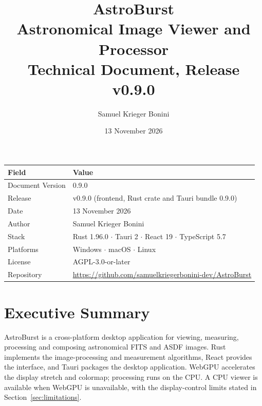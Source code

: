 \documentclass[11pt,a4paper]{article}
\title{
    \vspace{-1cm}
    {\Huge\bfseries\textcolor{astropurple}{AstroBurst}}\\[0.3cm]
    {\Large Astronomical Image Viewer and Processor}\\[0.2cm]
    {\large Technical Document, Release v0.9.0}
}
\author{Samuel Krieger Bonini}
\date{13 November 2026}
\begin{document}
    \maketitle
    \thispagestyle{empty}

    \vspace{0.5cm}

    \begin{center}
        \begin{tabularx}{\textwidth}{lX}
            \toprule
            \textbf{Field} & \textbf{Value} \\
            \midrule
            Document Version & 0.9.0 \\
            Release & v0.9.0 (frontend, Rust crate and Tauri bundle 0.9.0) \\
            Date & 13 November 2026 \\
            Author & Samuel Krieger Bonini \\
            Stack & Rust 1.96.0 $\cdot$ Tauri 2 $\cdot$ React 19 $\cdot$ TypeScript 5.7 \\
            Platforms & Windows $\cdot$ macOS $\cdot$ Linux \\
            License & AGPL-3.0-or-later \\
            Repository & \url{https://github.com/samuelkriegerbonini-dev/AstroBurst} \\
            \bottomrule
        \end{tabularx}
    \end{center}

    \clearpage
    \tableofcontents
    \clearpage

    \section{Executive Summary}

    AstroBurst is a cross-platform desktop application for viewing, measuring, processing and composing astronomical FITS and ASDF images. Rust implements the image-processing and measurement algorithms, React provides the interface, and Tauri packages the desktop application. WebGPU accelerates the display stretch and colormap; processing runs on the CPU. A CPU viewer is available when WebGPU is unavailable, with the display-control limits stated in Section~\ref{sec:limitations}.
\end{document}
